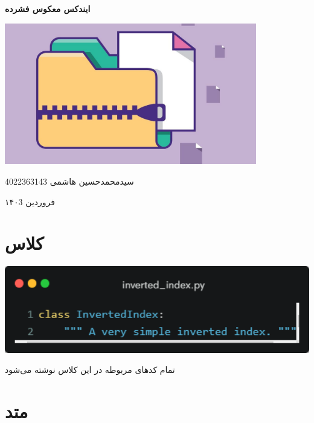 \documentclass[12pt, dvipsnames, svgnames, x11names,]{article}
\begin{document}
	\begin{titlepage}
		\centering
		\vspace{1cm}
		{\Huge {\textbf{ایندکس معکوس فشرده} \par {}}\par}
		\vspace{15mm}
		\vspace{16mm}
		\includegraphics[width=11cm]{images/0.jpg} \par
		\vfill \par	\vfill
		\vspace{16mm}
		{\normalsize	سیدمحمدحسین هاشمی  4022363143 \par}
		\vspace{1cm}
		{\large فروردین ۱۴۰3\par}
	\end{titlepage}
	\tableofcontents
	\newpage
	
	
	\section{کلاس }
	
		{\includegraphics[width=14cm]{images/1.png}}
		\vspace{1cm}
	
		{\normalsize تمام کدهای مربوطه در این کلاس نوشته می‌شود}
	
				
	
	\section{متد }
	
\end{document}
